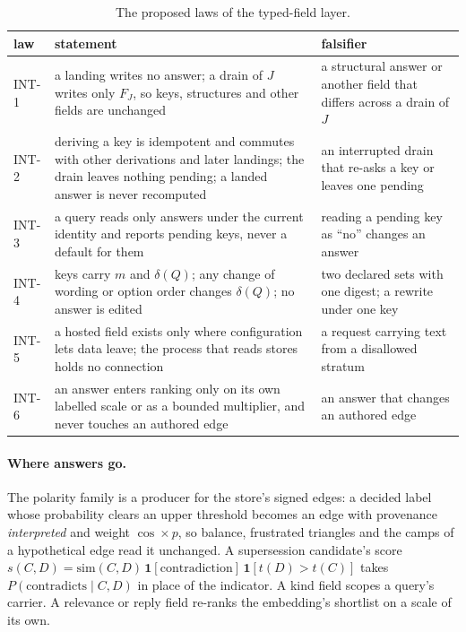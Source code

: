 \documentclass[11pt]{article}
\theoremstyle{definition}
\theoremstyle{plain}
\theoremstyle{remark}
\begin{document}
\begin{table}[t]
\centering\small
\begin{tabular}{@{}lp{}p{}@{}}
\toprule
law & statement & falsifier \\
\midrule
INT-1 & a landing writes no answer; a drain of $J$ writes only $F_J$, so keys, structures and other
fields are unchanged & a structural answer or another field that differs across a drain of $J$ \\
INT-2 & deriving a key is idempotent and commutes with other derivations and later landings; the
drain leaves nothing pending; a landed answer is never recomputed & an interrupted drain that
re-asks a key or leaves one pending \\
INT-3 & a query reads only answers under the current identity and reports pending keys, never a
default for them & reading a pending key as ``no'' changes an answer \\
INT-4 & keys carry $m$ and $\delta(Q)$; any change of wording or option order changes $\delta(Q)$;
no answer is edited & two declared sets with one digest; a rewrite under one key \\
INT-5 & a hosted field exists only where configuration lets data leave; the process that reads
stores holds no connection & a request carrying text from a disallowed stratum \\
INT-6 & an answer enters ranking only on its own labelled scale or as a bounded multiplier, and
never touches an authored edge & an answer that changes an authored edge \\
\bottomrule
\end{tabular}
\caption{The proposed laws of the typed-field layer.}\label{tab:laws}
\end{table}

\paragraph{Where answers go.} The polarity family is a producer for the store's signed edges: a
decided label whose probability clears an upper threshold becomes an edge with provenance
\emph{interpreted} and weight $\cos \times p$, so balance, frustrated triangles and the camps of a
hypothetical edge read it unchanged. A supersession candidate's score
$s(C, D) = \mathrm{sim}(C, D)\, \mathbf{1}[\mathrm{contradiction}]\, \mathbf{1}[t(D) > t(C)]$ takes
$P(\mathrm{contradicts} \mid C, D)$ in place of the indicator. A kind field scopes a query's
carrier. A relevance or reply field re-ranks the embedding's shortlist on a scale of its own.
\end{document}

